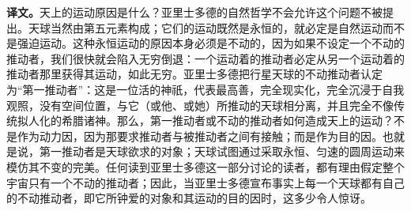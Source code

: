 \documentclass[UTF8]{ctexart}
\newcommand{\zh}{\par\noindent\textbf{译文。}\quad}
\begin{document}
\zh 天上的运动原因是什么？亚里士多德的自然哲学不会允许这个问题不被提出。天球当然由第五元素构成；它们的运动既然是永恒的，就必定是自然运动而不是强迫运动。这种永恒运动的原因本身必须是不动的，因为如果不设定一个不动的推动者，我们很快就会陷入无穷倒退：一个运动着的推动者必定从另一个运动着的推动者那里获得其运动，如此无穷。亚里士多德把行星天球的不动推动者认定为“第一推动者”：这是一位活的神祇，代表最高善，完全现实化，完全沉浸于自我观照，没有空间位置，与它（或他、或她）所推动的天球相分离，并且完全不像传统拟人化的希腊诸神。那么，第一推动者或不动的推动者如何造成天上的运动？不是作为动力因，因为那要求推动者与被推动者之间有接触；而是作为目的因。也就是说，第一推动者是天球欲求的对象；天球试图通过采取永恒、匀速的圆周运动来模仿其不变的完美。任何读到亚里士多德这一部分讨论的读者，都有理由假定整个宇宙只有一个不动的推动者；因此，当亚里士多德宣布事实上每一个天球都有自己的不动推动者，即它所钟爱的对象和其运动的目的因时，这多少令人惊讶。
\end{document}
